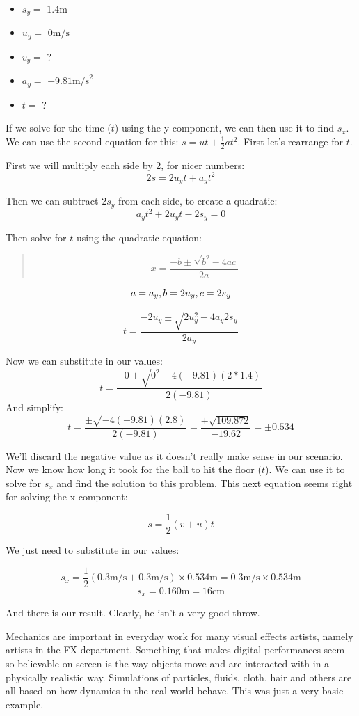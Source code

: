 \begin{itemize}
\tightlist
\item
  \(s_{y}=\) \(1.4\mathrm{m}\)
\item
  \(u_{y}=\) \(0\mathrm{m/s}\)
\item
  \(v_{y}=\) ?
\item
  \(a_{y}=\) \(-9.81\mathrm{m/s}^2\)
\item
  \(t=\) ?
\end{itemize}

If we solve for the time (\(t\)) using the y component, we can then use it to find \(s_{x}\). We can use the second equation for this: \(s=ut+\frac{1}{2}at^2\). First let's rearrange for \(t\).

First we will multiply each side by 2, for nicer numbers: \[2s=2u_{y}t+a_{y}t^2\]

Then we can subtract \(2s_{y}\) from each side, to create a quadratic: \[a_{y}t^2+2u_{y}t-2s_{y}=0\]

Then solve for \(t\) using the quadratic equation:

\begin{quote}
\[x=\frac{-b\pm\sqrt{b^2-4ac}}{2a}\]
\end{quote}

\[a=a_{y},\space b=2u_{y},\space c=2s_{y}\]

\[t=\frac{-2u_{y}\pm\sqrt{2u_{y}^2-4a_{y}2s_{y}}}{2a_{y}}\]

Now we can substitute in our values: \[t=\frac{-0\pm\sqrt{0^2-4(-9.81)(2*1.4)}}{2(-9.81)}\] And simplify: \[t=\frac{\pm\sqrt{-4(-9.81)(2.8)}}{2(-9.81)}=
\frac{\pm\sqrt{109.872}}{-19.62}=\pm0.534\]

We'll discard the negative value as it doesn't really make sense in our scenario. Now we know how long it took for the ball to hit the floor (\(t\)). We can use it to solve for \(s_{x}\) and find the solution to this problem. This next equation seems right for solving the x component:

\[s=\frac{1}{2}(v+u)t\]

We just need to substitute in our values:

\[s_{x}=\frac{1}{2}(0.3\mathrm{m/s}+0.3\mathrm{m/s})\times0.534\mathrm{m}=0.3\mathrm{m/s}\times0.534\mathrm{m}\] \[s_{x}=0.160\mathrm{m}=16\mathrm{cm}\]

And there is our result. Clearly, he isn't a very good throw.

Mechanics are important in everyday work for many visual effects artists, namely artists in the FX department. Something that makes digital performances seem so believable on screen is the way objects move and are interacted with in a physically realistic way. Simulations of particles, fluids, cloth, hair and others are all based on how dynamics in the real world behave. This was just a very basic example.

